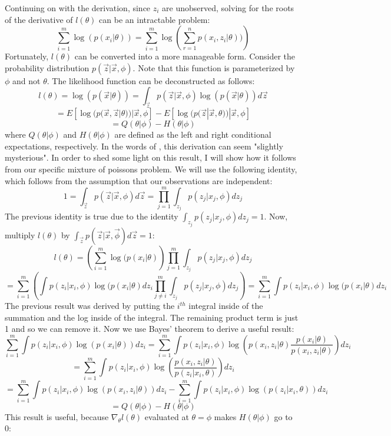 \documentclass[letter,12pt]{article}
\begin{document}
Continuing on with the derivation, since $z_i$ are unobserved, solving for the roots of the derivative of $l(\theta)$ can be an intractable problem:
\[
\sum_{i=1}^{m} \log(p(x_i|\theta)) = \sum_{i=1}^{m} \log\left(\sum_{r=1}^{n}p(x_i,z_i|\theta))\right)
\]
Fortunately, $l(\theta)$ can be converted into a more manageable form.  Consider the probability distribution $p(\vec{z}|\vec{x},\phi)$.  Note that this function is parameterized by $\phi$ and not $\theta$.  The likelihood function can be deconstructed as follows:
\[
l(\theta) = \log(p(\vec{x}|\theta)) 
= \int_{\vec{z}}p(\vec{z}|\vec{x},\phi)\log(p(\vec{x}|\theta))d\vec{z}
\]
\[
=
E[\log(p(\vec{x},\vec{z}|\theta))|\vec{x},\phi]
-
E[\log(p(\vec{z}|\vec{x},\theta))|\vec{x},\phi]
\]
\begin{equation} \label{eq:QH}
=Q(\theta|\phi)
-H(\theta|\phi)
\end{equation}
where $Q(\theta|\phi)$ and $H(\theta|\phi)$ are defined as the left and right conditional expectations, respectively.  In the words of \cite{lange1995a}, this derivation can seem "slightly mysterious".  In order to shed some light on this result, I will show how it follows from our specific mixture of poissons problem.  We will use the following identity, which follows from the assumption that our observations are independent:
\[
1 = \int_{\vec{z}}p(\vec{z}|\vec{x},\phi)d\vec{z}
= \prod_{j=1}^{m}\int_{z_j}p(z_j|x_j,\phi)dz_j
\]
The previous identity is true due to the identity $\int_{z_j}p(z_j|x_j,\phi)dz_j=1$.  Now, multiply $l(\theta)$ by $\int_{\vec{z}}p(\vec{z}|\vec{x},\vec{\phi})d\vec{z}=1$:
\[
l(\theta)
= \left( \sum_{i=1}^{m} \log(p(x_i|\theta)\right)
\prod_{j=1}^{m}\int_{z_j}p(z_j|x_j,\phi)dz_j
\]
\[
=  \sum_{i=1}^{m}\left( \int p(z_i|x_i,\phi)\log(p(x_i|\theta)dz_i
\prod_{j\neq i}^{m}\int_{z_j}p(z_j|x_j,\phi)dz_j\right)
=\sum_{i=1}^{m} \int p(z_i|x_i,\phi)\log(p(x_i|\theta)dz_i
\]
The previous result was derived by putting the $i^{th}$ integral inside of the summation and the log inside of the integral.  The remaining product term is just 1 and so we can remove it.  Now we use Bayes' theorem to derive a useful result:
\[
\sum_{i=1}^{m} \int p(z_i|x_i,\phi)\log(p(x_i|\theta))dz_i
= \sum_{i=1}^{m} \int p(z_i|x_i,\phi) \log \left(p(x_i,z_i|\theta)\frac{p(x_i|\theta)}{p(x_i,z_i|\theta)}\right) dz_i
\]
\[
=
\sum_{i=1}^{m} \int p(z_i|x_i,\phi) \log \left(\frac{p(x_i,z_i|\theta)}{p(z_i|x_i,\theta)}\right) dz_i
\]
\[
=
\sum_{i=1}^{m} \int p(z_i|x_i,\phi) \log \left(p(x_i,z_i|\theta)\right) dz_i
-
\sum_{i=1}^{m} \int p(z_i|x_i,\phi) \log \left(p(z_i|x_i,\theta)\right) dz_i
\] 
\[
=Q(\theta|\phi)
-H(\theta|\phi)
\]
This result is useful, because $\nabla_{\theta}l(\theta)$ evaluated at $\theta = \phi$ makes $H(\theta|\phi)$ go to 0: 
\end{document}
